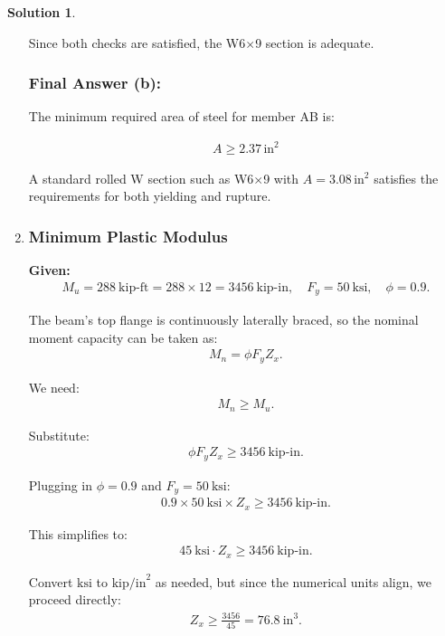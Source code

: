 \documentclass[12pt]{article}
\theoremstyle{definition} %
\newtheorem{solution}{Solution}
\theoremstyle{plain} %
\begin{document}
\begin{solution}
\begin{enumerate}
Since both checks are satisfied, the W6$\times$9 section is adequate.

\subsubsection*{Final Answer (b):}

The minimum required area of steel for member AB is:

\begin{align}
\boxed{A \geq 2.37 \, \text{in}^2}
\end{align}

A standard rolled W section such as W6$\times$9 with \( A = 3.08 \, \text{in}^2 \) satisfies the requirements for both yielding and rupture.

\hrulefill

\item \subsubsection*{Minimum Plastic Modulus}

\noindent\textbf{Given:}
\begin{align}
M_u = 288~\text{kip-ft} = 288 \times 12 = 3456~\text{kip-in}, \quad F_y = 50~\text{ksi}, \quad \phi = 0.9.
\end{align}

The beam’s top flange is continuously laterally braced, so the nominal moment capacity can be taken as:
\begin{align}
M_n = \phi F_y Z_x.
\end{align}

We need:
\begin{align}
M_n \geq M_u.
\end{align}

Substitute:
\begin{align}
\phi F_y Z_x \geq 3456~\text{kip-in}.
\end{align}

Plugging in $\phi = 0.9$ and $F_y = 50~\text{ksi}$:
\begin{align}
0.9 \times 50~\text{ksi} \times Z_x \geq 3456~\text{kip-in}.
\end{align}

This simplifies to:
\begin{align}
45~\text{ksi} \cdot Z_x \geq 3456~\text{kip-in}.
\end{align}

Convert $\text{ksi}$ to $\text{kip/in}^2$ as needed, but since the numerical units align, we proceed directly:
\begin{align}
Z_x \geq \frac{3456}{45} = 76.8~\text{in}^3.
\end{align}


\end{enumerate}
\end{solution}
\end{document}
